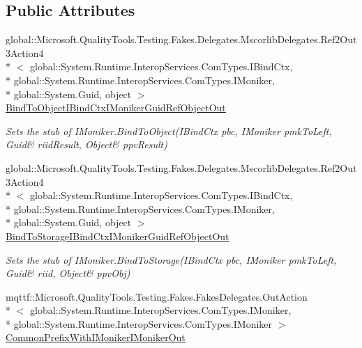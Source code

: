 \subsection*{Public Attributes}
\begin{DoxyCompactItemize}
\item 
global\-::\-Microsoft.\-Quality\-Tools.\-Testing.\-Fakes.\-Delegates.\-Mscorlib\-Delegates.\-Ref2\-Out3\-Action4\\*
$<$ global\-::\-System.\-Runtime.\-Interop\-Services.\-Com\-Types.\-I\-Bind\-Ctx, \\*
global\-::\-System.\-Runtime.\-Interop\-Services.\-Com\-Types.\-I\-Moniker, \\*
global\-::\-System.\-Guid, object $>$ \hyperlink{class_system_1_1_runtime_1_1_interop_services_1_1_com_types_1_1_fakes_1_1_stub_i_moniker_a2617f630be151eae9ba2cf7fd14ce87c}{Bind\-To\-Object\-I\-Bind\-Ctx\-I\-Moniker\-Guid\-Ref\-Object\-Out}
\begin{DoxyCompactList}\small\item\em Sets the stub of I\-Moniker.\-Bind\-To\-Object(I\-Bind\-Ctx pbc, I\-Moniker pmk\-To\-Left, Guid\& riid\-Result, Object\& ppv\-Result)\end{DoxyCompactList}\item 
global\-::\-Microsoft.\-Quality\-Tools.\-Testing.\-Fakes.\-Delegates.\-Mscorlib\-Delegates.\-Ref2\-Out3\-Action4\\*
$<$ global\-::\-System.\-Runtime.\-Interop\-Services.\-Com\-Types.\-I\-Bind\-Ctx, \\*
global\-::\-System.\-Runtime.\-Interop\-Services.\-Com\-Types.\-I\-Moniker, \\*
global\-::\-System.\-Guid, object $>$ \hyperlink{class_system_1_1_runtime_1_1_interop_services_1_1_com_types_1_1_fakes_1_1_stub_i_moniker_aeaa61bf9e71173825047fde09c692560}{Bind\-To\-Storage\-I\-Bind\-Ctx\-I\-Moniker\-Guid\-Ref\-Object\-Out}
\begin{DoxyCompactList}\small\item\em Sets the stub of I\-Moniker.\-Bind\-To\-Storage(I\-Bind\-Ctx pbc, I\-Moniker pmk\-To\-Left, Guid\& riid, Object\& ppv\-Obj)\end{DoxyCompactList}\item 
mqttf\-::\-Microsoft.\-Quality\-Tools.\-Testing.\-Fakes.\-Fakes\-Delegates.\-Out\-Action\\*
$<$ global\-::\-System.\-Runtime.\-Interop\-Services.\-Com\-Types.\-I\-Moniker, \\*
global\-::\-System.\-Runtime.\-Interop\-Services.\-Com\-Types.\-I\-Moniker $>$ \hyperlink{class_system_1_1_runtime_1_1_interop_services_1_1_com_types_1_1_fakes_1_1_stub_i_moniker_a6768e59f466d1991ca7f9c2971be80c1}{Common\-Prefix\-With\-I\-Moniker\-I\-Moniker\-Out}

\end{DoxyCompactItemize}
